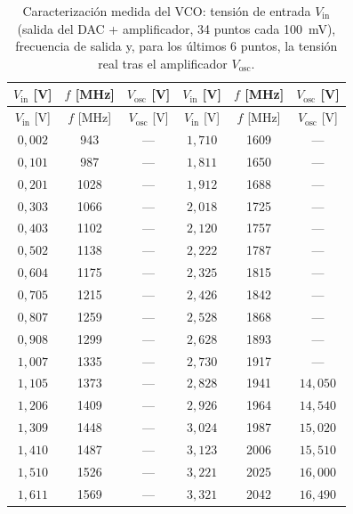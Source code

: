 \begin{longtable}{ccc@{\hspace{1.2cm}}ccc}
\caption{Caracterización medida del VCO: tensión de entrada $V_\text{in}$ (salida del DAC + amplificador, 34 puntos cada 100~mV), frecuencia de salida y, para los últimos 6 puntos, la tensión real tras el amplificador $V_\text{osc}$.}
\label{tab:vco_completa} \\
\toprule
$V_\text{in}$ [V] & $f$ [MHz] & $V_\text{osc}$ [V] & $V_\text{in}$ [V] & $f$ [MHz] & $V_\text{osc}$ [V] \\
\midrule
\endfirsthead
\toprule
$V_\text{in}$ [V] & $f$ [MHz] & $V_\text{osc}$ [V] & $V_\text{in}$ [V] & $f$ [MHz] & $V_\text{osc}$ [V] \\
\midrule
\endhead
\bottomrule
\endfoot
$0{,}002$ & 943 & --- & $1{,}710$ & 1609 & --- \\
$0{,}101$ & 987 & --- & $1{,}811$ & 1650 & --- \\
$0{,}201$ & 1028 & --- & $1{,}912$ & 1688 & --- \\
$0{,}303$ & 1066 & --- & $2{,}018$ & 1725 & --- \\
$0{,}403$ & 1102 & --- & $2{,}120$ & 1757 & --- \\
$0{,}502$ & 1138 & --- & $2{,}222$ & 1787 & --- \\
$0{,}604$ & 1175 & --- & $2{,}325$ & 1815 & --- \\
$0{,}705$ & 1215 & --- & $2{,}426$ & 1842 & --- \\
$0{,}807$ & 1259 & --- & $2{,}528$ & 1868 & --- \\
$0{,}908$ & 1299 & --- & $2{,}628$ & 1893 & --- \\
$1{,}007$ & 1335 & --- & $2{,}730$ & 1917 & --- \\
$1{,}105$ & 1373 & --- & $2{,}828$ & 1941 & $14{,}050$ \\
$1{,}206$ & 1409 & --- & $2{,}926$ & 1964 & $14{,}540$ \\
$1{,}309$ & 1448 & --- & $3{,}024$ & 1987 & $15{,}020$ \\
$1{,}410$ & 1487 & --- & $3{,}123$ & 2006 & $15{,}510$ \\
$1{,}510$ & 1526 & --- & $3{,}221$ & 2025 & $16{,}000$ \\
$1{,}611$ & 1569 & --- & $3{,}321$ & 2042 & $16{,}490$ \\
\end{longtable}
